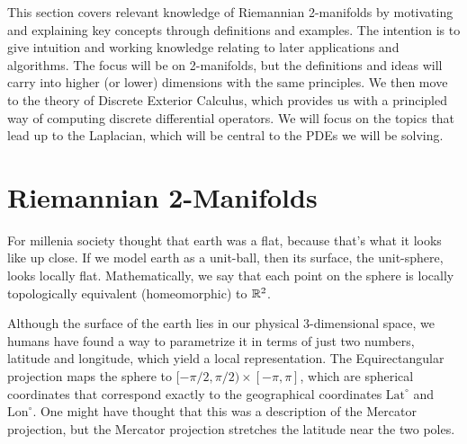 \ifdefined\COMPILINGFROMMAIN
\else
    
    
\fi
This section covers relevant knowledge of Riemannian 2-manifolds by motivating and explaining key concepts through definitions and examples. The intention is to give intuition and working knowledge relating to later applications and algorithms. The focus will be on 2-manifolds, but the definitions and ideas will carry into higher (or lower) dimensions with the same principles. 
We then move to the theory of Discrete Exterior Calculus, which provides us with a principled way of computing discrete differential operators. We will focus on the topics that lead up to the Laplacian, which will be central to the PDEs we will be solving.

\section*{Riemannian 2-Manifolds}

For millenia society thought that earth was a flat, because that's what it looks like up close. If we model earth as a unit-ball, then its surface, the unit-sphere, looks locally flat. Mathematically, we say that each point on the sphere is locally topologically equivalent (homeomorphic) to $\mathbb{R}^2$.

Although the surface of the earth lies in our physical 3-dimensional space, we humans have found a way to parametrize it in terms of just two numbers, latitude and longitude, which yield a local representation. The Equirectangular projection maps the sphere to $[-\pi/2, \pi/2) \times [-\pi, \pi]$, which are spherical coordinates that correspond exactly to the geographical coordinates $\text{Lat}^\circ$ and $\text{Lon}^\circ$. One might have thought that this was a description of the Mercator projection, but the Mercator projection stretches the latitude near the two poles.
    

